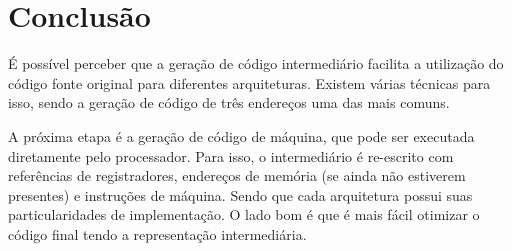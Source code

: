 \documentclass[12pt,a4paper]{article}
\begin{document}
\section{Conclusão}

É possível perceber que a geração de código intermediário facilita a utilização do código fonte original para diferentes arquiteturas. Existem várias técnicas para isso, sendo a geração de código de três endereços uma das mais comuns.

A próxima etapa é a geração de código de máquina, que pode ser executada diretamente pelo processador. Para isso, o intermediário é re-escrito com referências de registradores, endereços de memória (se ainda não estiverem presentes) e instruções de máquina. Sendo que cada arquitetura possui suas particularidades de implementação. O lado bom é que é mais fácil otimizar o código final tendo a representação intermediária.
\end{document}
